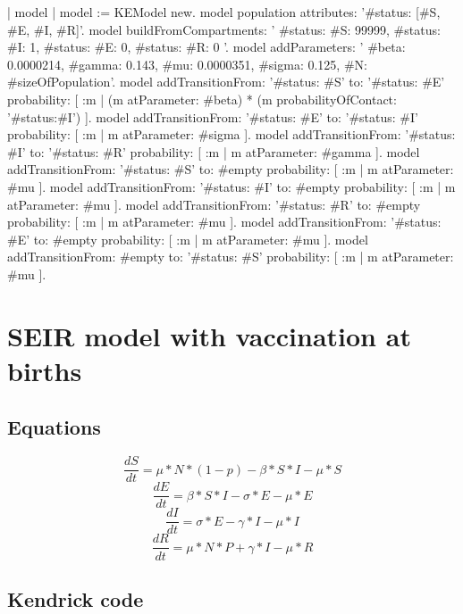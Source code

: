 \documentclass[a4paper,10pt,twoside]{book}
\begin{document}

\begin{code}{}
  | model |
	model := KEModel new.
	model population attributes: '{#status: [#S, #E, #I, #R]}'.
	model
		buildFromCompartments:
			'{
		{#status: #S}: 99999,
		{#status: #I}: 1,
		{#status: #E}: 0,
		{#status: #R}: 0
	}'.
	model addParameters: '{
		#beta: 0.0000214,
		#gamma: 0.143,
		#mu: 0.0000351,
		#sigma: 0.125,
		#N: #sizeOfPopulation}'.
	model
		addTransitionFrom: '{#status: #S}'
		to: '{#status: #E}'
		probability: [ :m | (m atParameter: #beta) * (m probabilityOfContact: '{#status:#I}') ].
	model
		addTransitionFrom: '{#status: #E}'
		to: '{#status: #I}'
		probability: [ :m | m atParameter: #sigma ].
	model
		addTransitionFrom: '{#status: #I}'
		to: '{#status: #R}'
		probability: [ :m | m atParameter: #gamma ].
	model
		addTransitionFrom: '{#status: #S}'
		to: #empty
		probability: [ :m | m atParameter: #mu ].
	model
		addTransitionFrom: '{#status: #I}'
		to: #empty
		probability: [ :m | m atParameter: #mu ].
	model
		addTransitionFrom: '{#status: #R}'
		to: #empty
		probability: [ :m | m atParameter: #mu ].
	model
		addTransitionFrom: '{#status: #E}'
		to: #empty
		probability: [ :m | m atParameter: #mu ].
	model
		addTransitionFrom: #empty
		to: '{#status: #S}'
		probability: [ :m | m atParameter: #mu ].
\end{code}

\section{ SEIR model with vaccination at births}\subsection{ Equations}

  \begin{equation}
    \frac{dS}{dt} = \mu*N*(1-p) - \beta*S*I - \mu*S
  \end{equation}
  \begin{equation}
    \frac{dE}{dt} = \beta*S*I - \sigma*E - \mu*E
  \end{equation}
  \begin{equation}
    \frac{dI}{dt} = \sigma*E - \gamma*I - \mu*I
  \end{equation}
  \begin{equation}
    \frac{dR}{dt} = \mu*N*P + \gamma*I - \mu*R
  \end{equation}
  
\subsection{ Kendrick code}
\end{document}
